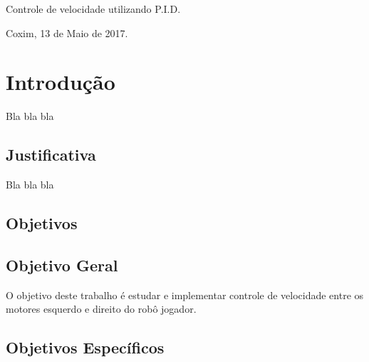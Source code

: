 \documentclass[a4paper,12pt,portuguese]{ufms-cpcx}
\begin{document}
\begin{center}
	
	\begin{minipage}[t]{10cm}
		\begin{center}
			\vspace{-2cm}
			{{\Large Controle de velocidade utilizando P.I.D.}}  
		\end{center}
	\end{minipage}
	
\end{center}

\vskip 3.0cm 

\begin{flushright}
	\vspace{12cm}
	Coxim, 13 de Maio de 2017.
\end{flushright}









\chapter{Introdução}
Bla bla bla
 
 
 \section{Justificativa}  
 Bla bla bla


 \section{Objetivos}
 
 
 \section{Objetivo Geral}  
  
 O objetivo deste trabalho é estudar e implementar controle de velocidade entre os motores esquerdo e direito do robô jogador. 

\section{Objetivos Específicos}
\end{document}
